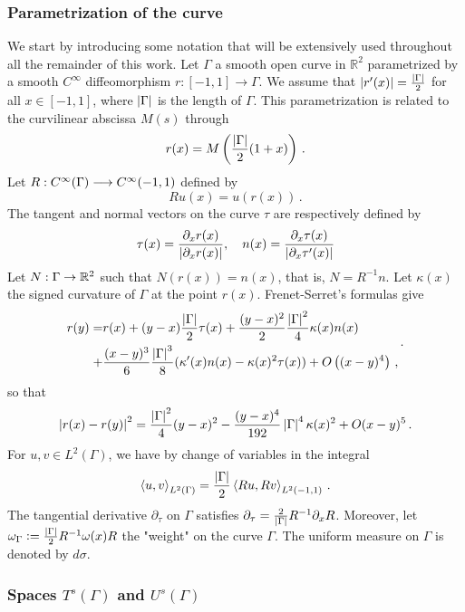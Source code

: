 \documentclass[a4paper]{article}
\begin{document}
\subsubsection*{Parametrization of the curve}
	We start by introducing some notation that will be extensively used throughout all the remainder of this work. Let $\Gamma$ a smooth open curve in $\mathbb{R}^2$ parametrized by a smooth $C^\infty$ diffeomorphism $r : [-1,1] \to \Gamma$. We assume that $\left\lvert r'(x) \right\rvert = \frac{\left\lvert \Gamma \right\rvert}{2}$ for all $x\in [-1,1]$, where $\left\lvert \Gamma \right\rvert$ is the length of $\Gamma$. This parametrization is related to the curvilinear abscissa $M(s)$ through
\[r(x) = M\left( \frac{\left\lvert \Gamma \right\rvert}{2}(1+x)\right)\,.\]
Let $R : C^{\infty}(\Gamma) \longrightarrow C^{\infty}(-1,1)$ defined by 
\[Ru(x) = u(r(x))\,.\]
The tangent and normal vectors on the curve $\tau$ are respectively defined by 
\[\tau(x) = \frac{\partial_x r(x)}{\left\lvert \partial_x r(x) \right\rvert}, \quad n(x) = \frac{\partial_x \tau(x)}{\left\lvert \partial_x \tau'(x) \right\rvert}\]
Let $N : \Gamma \to \mathbb{R}^2$ such that $N(r(x)) = n(x)$, that is, $N = R^{-1} n$. Let $\kappa(x)$ the signed curvature of $\Gamma$ at the point $r(x)$. Frenet-Serret's formulas give
\[\begin{split}r(y) = & r(x) + (y-x) \frac{\left\lvert \Gamma \right\rvert}{2} \tau(x) + \frac{(y-x)^2}{2} \frac{\left\lvert \Gamma \right\rvert^2}{4} \kappa(x) n(x)\\ 
+ &\frac{(x-y)^3}{6} \frac{\left\lvert \Gamma \right\rvert^3}{8} (\kappa'(x) n(x) - \kappa(x)^2 \tau(x)) + O\left((x-y)^4\right)\,,
\end{split}\,.\]
so that
\begin{equation}
\left\lvert r(x) - r(y) \right\rvert^2 = \frac{\left\lvert \Gamma \right\rvert^2}{4}(y-x)^2 - \frac{(y-x)^4}{192}\left\lvert \Gamma \right\rvert^4 \kappa(x)^2 + O(x-y)^5\,. 
\label{expansion_r}
\end{equation}
For $u,v \in L^2(\Gamma)$, we have by change of variables in the integral
\[\left\langle u,v\right\rangle_{L^2(\Gamma)} = \frac{\left\lvert \Gamma \right\rvert}{2}\left\langle Ru,Rv\right\rangle_{L^2(-1,1)} \,.\]
The tangential derivative $\partial_\tau$ on $\Gamma$ satisfies $\partial_\tau = \frac{2}{\left\lvert \Gamma \right\rvert}R^{-1}\partial_x R$. Moreover, let $\omega_\Gamma \mathrel{\mathop:}= \frac{\left\lvert \Gamma \right\rvert}{2} R^{-1}  \omega(x) R$ the "weight" on the curve $\Gamma$. The uniform measure on $\Gamma$ is denoted by $d\sigma$.

\subsubsection*{Spaces $T^s(\Gamma)$ and $U^s(\Gamma)$}
\end{document}
